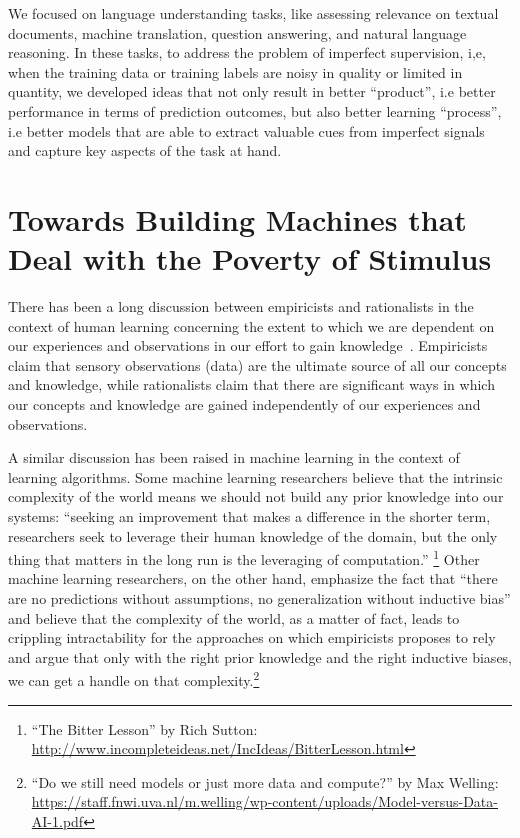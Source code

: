 We focused on language understanding tasks, like assessing relevance on textual documents, machine translation, question answering, and natural language reasoning.
In these tasks, to address the problem of imperfect supervision, i,e, when the training data or training labels are noisy in quality or limited in quantity, we developed ideas that not only result in better ``product'', i.e better performance in terms of prediction outcomes, but also better learning ``process'', i.e better models that are able to extract valuable cues from imperfect signals and capture key aspects of the task at hand.


\section{Towards Building Machines that Deal with the Poverty of Stimulus}

There has been a long discussion between empiricists and rationalists in the context of human learning concerning the extent to which we are dependent on our experiences and observations in our effort to gain knowledge~\citep{markie2004rationalism}.  
%
Empiricists claim that sensory observations (data) are the ultimate source of all our concepts and knowledge, while rationalists claim that there are significant ways in which our concepts and knowledge are gained independently of our experiences and observations. 

A similar discussion has been raised in machine learning in the context of learning algorithms.
%
Some machine learning researchers believe that the intrinsic complexity of the world means we should not build any prior knowledge into our systems: ``seeking an improvement that makes a difference in the shorter term, researchers seek to leverage their human knowledge of the domain, but the only thing that matters in the long run is the leveraging of computation.''%
\footnote{``The Bitter Lesson'' by Rich Sutton: \url{http://www.incompleteideas.net/IncIdeas/BitterLesson.html}}
%
Other machine learning researchers, on the other hand, emphasize the fact that ``there are no predictions without assumptions, no generalization without inductive bias'' and believe that the complexity of the world, as a matter of fact, leads to crippling intractability for the approaches on which empiricists proposes to rely and argue that only with the right prior knowledge and the right inductive biases, we can get a handle on that complexity.\footnote{``Do we still need models or just more data and compute?'' by Max Welling: \url{https://staff.fnwi.uva.nl/m.welling/wp-content/uploads/Model-versus-Data-AI-1.pdf}}


